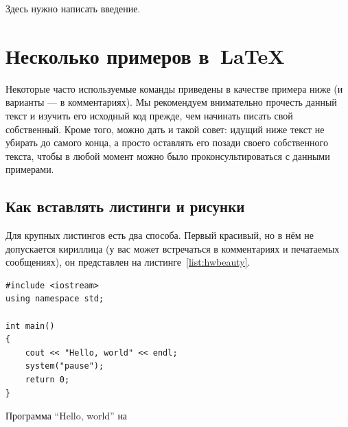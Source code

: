





\Intro

Здесь нужно написать введение.

\section{Несколько примеров в~\LaTeX{}}
\label{sec:examples}

Некоторые часто используемые
команды приведены в качестве примера ниже (и варианты — в
комментариях). Мы рекомендуем внимательно прочесть данный
текст и изучить его исходный код прежде, чем начинать писать
свой собственный. Кроме того, можно дать и такой совет: идущий
ниже текст не убирать до самого конца, а просто оставлять его
позади своего собственного текста, чтобы в любой момент можно
было проконсультироваться с данными примерами.

\subsection{Как вставлять листинги и рисунки}

Для крупных листингов есть два способа. Первый красивый, но в нём не допускается
кириллица (у вас может встречаться в комментариях и
печатаемых сообщениях), он представлен на листинге~\ref{list:hwbeauty}.
\begin{ListingEnv}[H]%
\begin{lstlisting}
#include <iostream>
using namespace std;

int main()
{
    cout << "Hello, world" << endl;
    system("pause");
    return 0;
}
\end{lstlisting}
\caption{Программа “Hello, world” на \protect\cpp}
\label{list:hwbeauty}
\end{ListingEnv}

